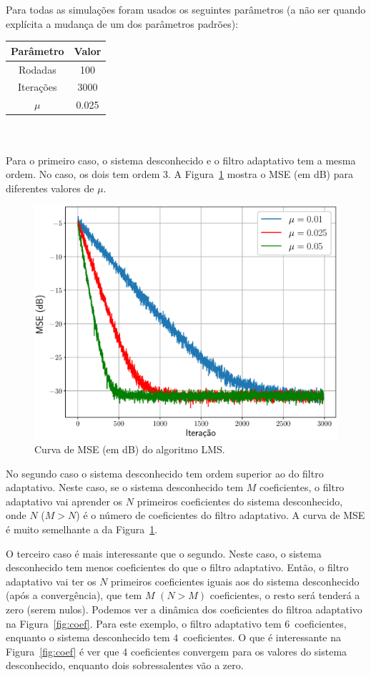 \documentclass{homeworkclass}
\begin{document}
\begin{homeworkProblem}
	Para todas as simulações foram usados os seguintes parâmetros (a não ser quando explícita a mudança de um dos parâmetros padrões): \\
	
	\begin{tabular}[!ht]{|c|c|}
		\hline 
		\textbf{Parâmetro} & \textbf{Valor} \\ 
		\hline 
		Rodadas & 100 \\ 
		\hline 
		Iterações & 3000 \\ 
		\hline 
		$\mu$ & 0.025 \\ 
		\hline 
	\end{tabular}  \\ \\
	
	Para o primeiro caso, o sistema desconhecido e o filtro adaptativo tem a mesma ordem. No caso, os dois tem ordem 3. A Figura~\ref{fig:mselms} mostra o MSE (em dB) para diferentes valores de $\mu$. 
	
	\begin{figure}[!ht]
		\centering
		\includegraphics[width=0.6\linewidth]{figs/mse_lms}
		\caption{Curva de MSE (em dB) do algoritmo LMS.}
		\label{fig:mselms}
	\end{figure}
	
	\pagebreak
	
	No segundo caso o sistema desconhecido tem ordem superior ao do filtro adaptativo. Neste caso, se o sistema desconhecido tem $M$ coeficientes, o filtro adaptativo vai aprender os $N$ primeiros coeficientes do sistema desconhecido, onde $N$ ($M > N$) é o número de coeficientes do filtro adaptativo. A curva de MSE é muito semelhante a da Figura~\ref{fig:mselms}. 
	
	O terceiro caso é mais interessante que o segundo. Neste caso, o sistema desconhecido tem menos coeficientes do que o filtro adaptativo. Então, o filtro adaptativo vai ter os $N$ primeiros coeficientes iguais aos do sistema desconhecido (após a convergência), que tem $M$ $(N > M)$ coeficientes, o resto será tenderá a zero (serem nulos). 	Podemos ver a dinâmica dos coeficientes do filtroa adaptativo na Figura~\ref{fig:coef}. Para este exemplo, o filtro adaptativo tem $6$~coeficientes, enquanto o sistema desconhecido tem $4$~coeficientes. O que é interessante na Figura~\ref{fig:coef} é ver que 4 coeficientes convergem para os valores do sistema desconhecido, enquanto dois sobressalentes vão a zero.
	

\end{homeworkProblem}
\end{document}
